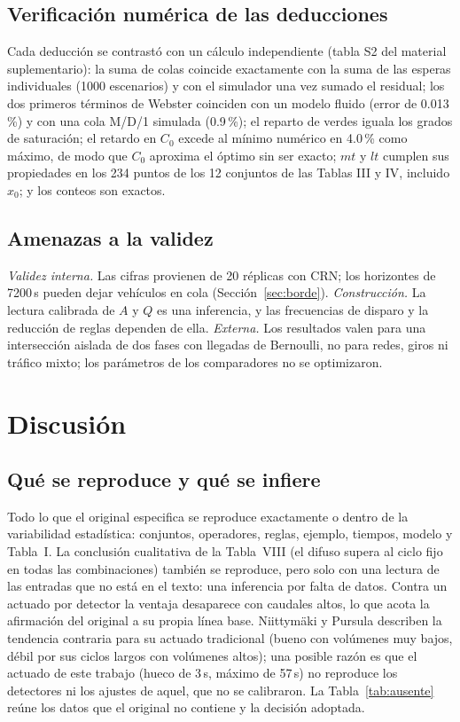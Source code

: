\documentclass[journal]{IEEEtran}
\begin{document}
\subsection{Verificación numérica de las deducciones}
\label{sec:verif-formulas}
Cada deducción se contrastó con un cálculo independiente (tabla S2 del material suplementario): la suma de colas coincide exactamente con la suma de las esperas individuales (1000 escenarios) y con el simulador una vez sumado el residual; los dos primeros términos de Webster coinciden con un modelo fluido (error de 0.013\,\%) y con una cola M/D/1 simulada (0.9\,\%); el reparto de verdes iguala los grados de saturación; el retardo en $C_0$ excede al mínimo numérico en 4.0\,\% como máximo, de modo que $C_0$ aproxima el óptimo sin ser exacto; $mt$ y $lt$ cumplen sus propiedades en los 234 puntos de los 12 conjuntos de las Tablas III y IV, incluido $x_0$; y los conteos son exactos.

\subsection{Amenazas a la validez}
\textit{Validez interna.} Las cifras provienen de 20 réplicas con CRN; los horizontes de 7200\,s pueden dejar vehículos en cola (Sección~\ref{sec:borde}). \textit{Construcción.} La lectura calibrada de $A$ y $Q$ es una inferencia, y las frecuencias de disparo y la reducción de reglas dependen de ella. \textit{Externa.} Los resultados valen para una intersección aislada de dos fases con llegadas de Bernoulli, no para redes, giros ni tráfico mixto; los parámetros de los comparadores no se optimizaron.

\section{Discusión}
\label{sec:discusion}

\subsection{Qué se reproduce y qué se infiere}
Todo lo que el original especifica se reproduce exactamente o dentro de la variabilidad estadística: conjuntos, operadores, reglas, ejemplo, tiempos, modelo y Tabla~I. La conclusión cualitativa de la Tabla~VIII (el difuso supera al ciclo fijo en todas las combinaciones) también se reproduce, pero solo con una lectura de las entradas que no está en el texto: una inferencia por falta de datos. Contra un actuado por detector la ventaja desaparece con caudales altos, lo que acota la afirmación del original a su propia línea base. Niittymäki y Pursula \cite{Niittymaki2000} describen la tendencia contraria para su actuado tradicional (bueno con volúmenes muy bajos, débil por sus ciclos largos con volúmenes altos); una posible razón es que el actuado de este trabajo (hueco de 3\,s, máximo de 57\,s) no reproduce los detectores ni los ajustes de aquel, que no se calibraron. La Tabla~\ref{tab:ausente} reúne los datos que el original no contiene y la decisión adoptada.
\end{document}
